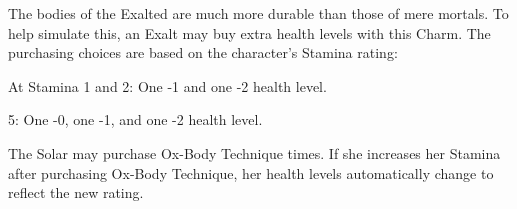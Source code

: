 
The bodies of the Exalted are much more durable than those of mere mortals. To
help simulate this, an Exalt may buy extra health levels with this Charm. The
purchasing choices are based on the character's Stamina rating:

At Stamina 1 and 2: One -1 and one -2 health level.


5: One -0, one -1, and one -2 health level.

The Solar may purchase Ox-Body Technique  times. If she
increases her Stamina after purchasing Ox-Body Technique, her health levels
automatically change to reflect the new rating.


\printbibliography[title=References]


\onecolumn
\pagestyle{empty}
\cleardoublepage

\pagestyle{main}

\PrintCharmList


